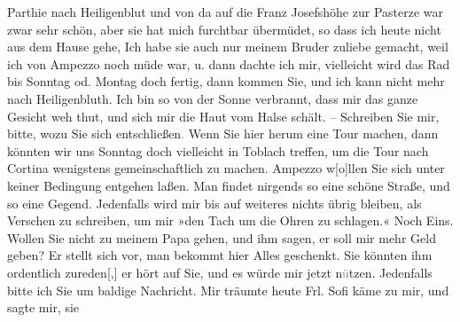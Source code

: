 \begin{ledgroupsized}[t]{13cm}
               Parthie nach Heiligenblut und von da auf die
                  Franz Josefshöhe zur Pasterze war zwar sehr schön, aber sie hat mich furchtbar
               übermüdet, so dass ich heute nicht aus dem Hause gehe, Ich habe sie auch nur meinem
                  Bruder
               zuliebe gemacht, weil ich von Ampezzo noch müde
               war, u. dann dachte ich mir, vielleicht wird das Rad bis Sonntag od.
                  Montag doch fertig, dann kommen Sie, und ich kann nicht mehr nach Heiligenbluth. Ich bin so von der Sonne
               verbrannt, dass mir das ganze Gesicht weh thut, und sich mir die Haut vom Halse
               schält. – \pend
           \pstart
           {\pb}Schreiben Sie mir, bitte,
               wozu Sie sich entschließen\textcolor{gray}{.} Wenn Sie hier herum eine Tour machen,
               dann könnten wir uns Sonntag doch vielleicht in Toblach treffen, um die Tour nach Cortina wenigstens gemeinschaftlich zu machen. \pend
           \pstart
           Ampezzo w{[}o{]}llen Sie sich
               unter keiner Bedingung entgehen laßen. Man findet nirgends so eine schöne Straße, und
               so eine Gegend. \pend
           \pstart
           Jedenfalls wird mir bis auf weiteres nichts übrig bleiben, als Verschen zu schreiben,
               um mir »den Tach um die Ohren zu schlagen.« \pend
           \pstart
           Noch Eins. Wollen Sie nicht zu meinem Papa gehen, und ihm sagen, er soll mir mehr Geld geben? Er
               stellt sich vor, man bekommt hier Alles geschenkt. Sie könnten ihm ordentlich
                  zureden{[},{]} er hört auf Sie, und es würde mir jetzt
                  n\textcolor{gray}{ü}tzen. \pend
           \pstart
           Jedenfalls bitte ich Sie um baldige Nachricht. Mir träumte heute Frl. Sofi käme zu mir, und sagte mir, sie

\end{ledgroupsized}
